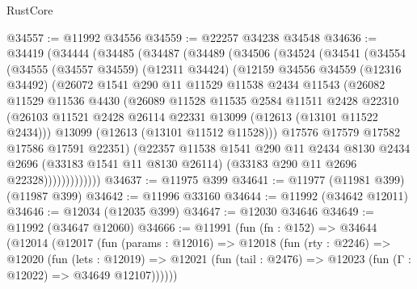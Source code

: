 \begin{lexlean}{RustCore}
\begin{coremodule}
@34557 := @11992 @34556
@34559 := @22257 @34238 @34548
@34636 := @34419
    (@34444
      (@34485
        (@34487
          (@34489
            (@34506
              (@34524
                (@34541
                  (@34554
                    (@34555
                      (@34557 @34559)
                      (@12311 @34424)
                      (@12159
                        @34556
                        @34559
                        (@12316 @34492)
                        (@26072
                          @1541
                          @290
                          @11
                          @11529
                          @11538
                          @2434
                          @11543
                          (@26082
                            @11529
                            @11536
                            @4430
                            (@26089
                              @11528
                              @11535
                              @2584
                              @11511
                              @2428
                              @22310
                              (@26103
                                @11521
                                @2428
                                @26114
                                @22331
                                @13099
                                (@12613 (@13101 @11522 @2434)))
                              @13099
                              (@12613 (@13101 @11512 @11528)))
                            @17576
                            @17579
                            @17582
                            @17586
                            @17591
                            @22351)
                          (@22357
                            @11538
                            @1541
                            @290
                            @11
                            @2434
                            @8130
                            @2434
                            @2696
                            (@33183 @1541 @11 @8130 @26114)
                            (@33183 @290 @11 @2696 @22328)))))))))))))
@34637 := @11975 @399
@34641 := @11977 (@11981 @399) (@11987 @399)
@34642 := @11996 @33160
@34644 := @11992 (@34642 @12011)
@34646 := @12034 (@12035 @399)
@34647 := @12030 @34646
@34649 := @11992 (@34647 @12060)
@34666 := @11991
    (fun (fn : @152) =>
    @34644
      (@12014
        (@12017
          (fun (params : @12016) =>
          @12018
            (fun (rty : @2246) =>
            @12020
              (fun (lets : @12019) =>
              @12021 (fun (tail : @2476) => @12023 (fun (Γ : @12022) => @34649 @12107))))))

\end{coremodule}
\end{lexlean}
